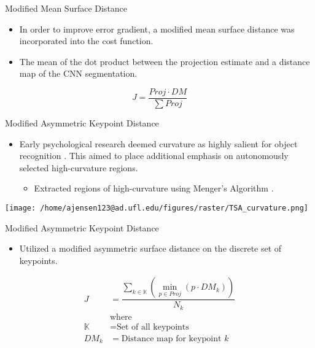 \documentclass[presentation, aspectratio=1610]{beamer}
\begin{document}
\begin{frame}[label={sec:orgd48752c}]{Modified Mean Surface Distance}
\begin{itemize}
\item In order to improve error gradient, a modified mean surface distance was incorporated into the cost function.
\item The mean of the dot product between the projection estimate and a distance map of the CNN segmentation.
\end{itemize}
\begin{equation}
  \label{eq:DMCF}
  J = \dfrac{Proj \cdot DM}{\sum Proj}
\end{equation}
\end{frame}
\begin{frame}[label={sec:orgad6395b}]{Modified Asymmetric Keypoint Distance}
\begin{itemize}
\item Early psychological research deemed curvature as highly salient for object recognition \autocites{attneaveInformationalAspectsVisual1954}[][]{attneaveQuantitativeStudyShape1956}. This aimed to place additional emphasis on autonomously selected high-curvature regions.
\begin{itemize}
\item Extracted regions of high-curvature using Menger's Algorithm \autocite{legerMengerCurvatureRectifiability1999}.
\end{itemize}
\end{itemize}

\begin{center}
\texttt{[image: /home/ajensen123@ad.ufl.edu/figures/raster/TSA\_curvature.png]}
\end{center}
\end{frame}
\begin{frame}[label={sec:org8fc5555}]{Modified Asymmetric Keypoint Distance}
\begin{itemize}
\item Utilized a modified asymmetric surface distance on the discrete set of keypoints.
\end{itemize}

\begin{equation}
  \label{eq:curv-keypoint}
  \begin{split}
    \displaystyle J &= \dfrac{\sum_{k \in \mathbb{K}}(\min_{p\in Proj}(p \cdot DM_{k}))}{N_k} \\
      &\text{where}\\
    \mathbb{K} &= \text{Set of all keypoints} \\
    DM_{k} &= \text{Distance map for keypoint $k$} \\
  \end{split}
\end{equation}
\end{frame}
\end{document}
